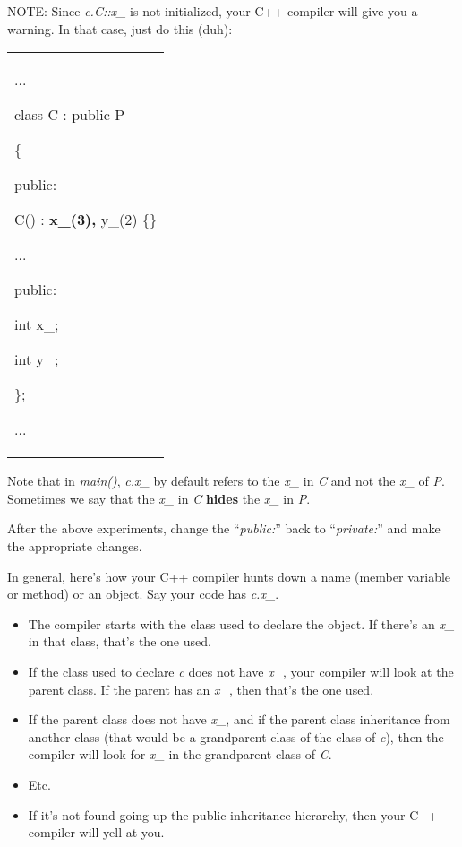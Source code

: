 \documentclass[
]{article}
\providecommand{\tightlist}{%
  \setlength{\itemsep}{0pt}\setlength{\parskip}{0pt}}
\begin{document}
NOTE: Since \emph{c.C::x\_} is not initialized, your C++ compiler will
give you a warning. In that case, just do this (duh):

\begin{longtable}[]{@{}
  >{\raggedright\arraybackslash}p{}@{}}
\toprule\noalign{}
 \\
\midrule\noalign{}
\endhead
\bottomrule\noalign{}
\endlastfoot
...

class C : public P

\{

public:

C() : \textbf{x\_(3), }y\_(2) \{\}

...

public:

int x\_;

int y\_;

\};

... \\
\end{longtable}

Note that in \emph{main()}, \emph{c.x\_} by default refers to the
\emph{x\_} in \emph{C} and not the \emph{x\_} of \emph{P}. Sometimes we
say that the \emph{x\_} in \emph{C} \textbf{hides} the \emph{x\_} in
\emph{P}.

After the above experiments, change the ``\emph{public:}'' back to
``\emph{private:}'' and make the appropriate changes.

In general, here's how your C++ compiler hunts down a name (member
variable or method) or an object. Say your code has \emph{c.x\_}.

\begin{itemize}
\tightlist
\item
  The compiler starts with the class used to declare the object. If
  there's an \emph{x\_} in that class, that's the one used.
\item
  If the class used to declare \emph{c} does not have \emph{x\_}, your
  compiler will look at the parent class. If the parent has an
  \emph{x\_}, then that's the one used.
\item
  If the parent class does not have \emph{x\_}, and if the parent class
  inheritance from another class (that would be a grandparent class of
  the class of \emph{c}), then the compiler will look for \emph{x\_} in
  the grandparent class of \emph{C}.
\item
  Etc.
\item
  If it's not found going up the public inheritance hierarchy, then your
  C++ compiler will yell at you.
\end{itemize}
\end{document}
